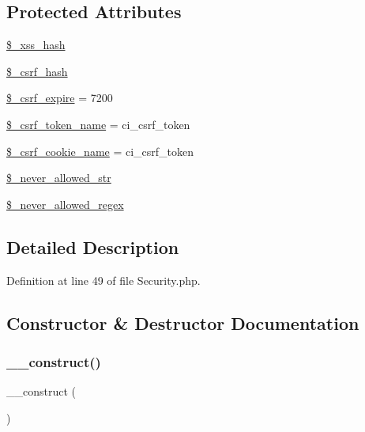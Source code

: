 \subsection*{Protected Attributes}
\begin{DoxyCompactItemize}
\item 
\mbox{\hyperlink{class_c_i___security_aca426a0e87199bfa36c7401a1d06a419}{\$\+\_\+xss\+\_\+hash}}
\item 
\mbox{\hyperlink{class_c_i___security_a8bf24cc529f04164ac20d892ce20d721}{\$\+\_\+csrf\+\_\+hash}}
\item 
\mbox{\hyperlink{class_c_i___security_af86a83f20de2a3c522bf690d4080c08e}{\$\+\_\+csrf\+\_\+expire}} = 7200
\item 
\mbox{\hyperlink{class_c_i___security_a6752ebca4be235c079785a87a693d932}{\$\+\_\+csrf\+\_\+token\+\_\+name}} = \textquotesingle{}ci\+\_\+csrf\+\_\+token\textquotesingle{}
\item 
\mbox{\hyperlink{class_c_i___security_a52043f2c9ffb0e14eade8e67a0172a82}{\$\+\_\+csrf\+\_\+cookie\+\_\+name}} = \textquotesingle{}ci\+\_\+csrf\+\_\+token\textquotesingle{}
\item 
\mbox{\hyperlink{class_c_i___security_ab883fab930a1c4a926eaa501ab211823}{\$\+\_\+never\+\_\+allowed\+\_\+str}}
\item 
\mbox{\hyperlink{class_c_i___security_ac502ee17d09eb8bbd70a6fb1f9515503}{\$\+\_\+never\+\_\+allowed\+\_\+regex}}
\end{DoxyCompactItemize}


\subsection{Detailed Description}


Definition at line 49 of file Security.\+php.



\subsection{Constructor \& Destructor Documentation}
\mbox{\label{class_c_i___security_a095c5d389db211932136b53f25f39685}} 
\subsubsection{\texorpdfstring{\_\_construct()}{\_\_construct()}}
{\footnotesize\ttfamily \+\_\+\+\_\+construct (\begin{DoxyParamCaption}{ }\end{DoxyParamCaption})}

